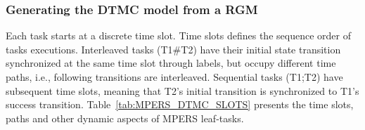 \subsubsection{Generating the DTMC model from a RGM}

Each task starts at a discrete time slot. Time slots defines the sequence order of tasks executions. Interleaved tasks (T1\#T2) have their initial state transition synchronized at the same time slot through labels, but occupy different time paths, i.e., following transitions are interleaved. Sequential tasks (T1;T2) have subsequent time slots, meaning that T2's initial transition is synchronized to T1's success transition. Table~\ref{tab:MPERS_DTMC_SLOTS} presents the time slots, paths and other dynamic aspects of MPERS leaf-tasks.


